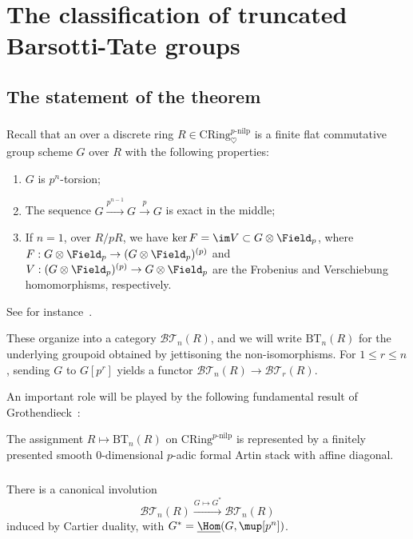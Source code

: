 \documentclass[10pt]{amsart}
\begin{document}
\section{The classification of truncated Barsotti-Tate groups}
\label{sec:bt_classification}

\subsection{The statement of the theorem}


\subsubsection{}
Recall that an  over a discrete ring $R\in \mathrm{CRing}^{p\text{-nilp}}_\heartsuit$ is a finite flat commutative group scheme $G$ over $R$ with the following properties:
\begin{enumerate}
   \item $G$ is $p^n$-torsion;
   \item The sequence $G\xrightarrow{p^{n-1}}G\xrightarrow{p}G$ is exact in the middle;
   \item If $n = 1$, over $R/pR$, we have $\ker F = \im V\subset G\otimes\Field_p$, where $F:G\otimes\Field_p\to (G\otimes\Field_p)^{(p)}$ and $V:(G\otimes\Field_p)^{(p)}\to G\otimes\Field_p$ are the Frobenius and Verschiebung homomorphisms, respectively.
\end{enumerate}
See for instance~\cite[\S I]{MR0801922}.

These organize into a category $\mathcal{BT}_n(R)$, and we will write $\mathrm{BT}_n(R)$ for the underlying groupoid obtained by jettisoning the non-isomorphisms. For $1\leq r\leq n$, sending $G$ to $G[p^r]$ yields a functor $\mathcal{BT}_n(R)\to \mathcal{BT}_r(R)$.


An important role will be played by the following fundamental result of Grothendieck~\cite{MR0801922}:

\begin{theorem}
\label{thm:grothendieck}
The assignment $R\mapsto \mathrm{BT}_n(R)$ on $\mathrm{CRing}^{p\text{-nilp}}$ is represented by a finitely presented smooth $0$-dimensional $p$-adic formal Artin stack with affine diagonal.
\end{theorem}

\subsubsection{}
There is a canonical involution 
\[
\mathcal{BT}_n(R) \xrightarrow{G\mapsto G^*}\mathcal{BT}_n(R)
\]
induced by Cartier duality, with $G^* =\underline{\Hom}(G,\mup[p^n])$.
\end{document}
